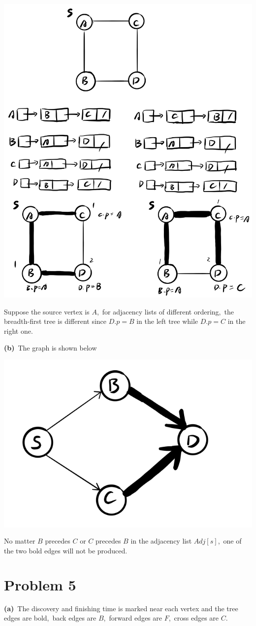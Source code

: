 \documentclass[]{article}
\begin{document}
	\includegraphics[width=.9\textwidth]{1.png}
	
	Suppose the source vertex is $A$,\ for adjacency lists of different ordering,\ the breadth-first tree is different since $D.p = B$ in the left tree while $D.p = C$ in the right one.
	
	\textbf{(b)}\ The graph is shown below
	
	\includegraphics[width=.5\textwidth]{2.png}
	
	No matter $B$ precedes $C$ or $C$ precedes $B$ in the adjacency list $Adj[s]$,\ one of the two bold edges will not be produced.
	
	\section{Problem 5}
	\textbf{(a)}\ The discovery and finishing time is marked near each vertex and the tree edges are bold,\ back edges are $B$,\ forward edges are $F$,\ cross edges are $C$.
	
\end{document}
